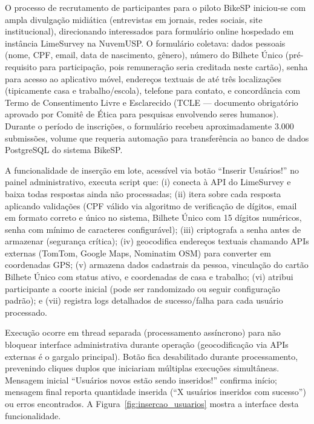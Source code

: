 

O processo de recrutamento de participantes para o piloto BikeSP iniciou-se com ampla divulgação midiática (entrevistas em jornais, redes sociais, site institucional), direcionando interessados para formulário online hospedado em instância LimeSurvey na NuvemUSP. O formulário coletava: dados pessoais (nome, CPF, email, data de nascimento, gênero), número do Bilhete Único (pré-requisito para participação, pois remuneração seria creditada neste cartão), senha para acesso ao aplicativo móvel, endereços textuais de até três localizações (tipicamente casa e trabalho/escola), telefone para contato, e concordância com Termo de Consentimento Livre e Esclarecido (TCLE --- documento obrigatório aprovado por Comitê de Ética para pesquisas envolvendo seres humanos). Durante o período de inscrições, o formulário recebeu aproximadamente 3.000 submissões, volume que requeria automação para transferência ao banco de dados PostgreSQL do sistema BikeSP.

A funcionalidade de inserção em lote, acessível via botão ``Inserir Usuários!'' no painel administrativo, executa script que: (i) conecta à API do LimeSurvey e baixa todas respostas ainda não processadas; (ii) itera sobre cada resposta aplicando validações (CPF válido via algoritmo de verificação de dígitos, email em formato correto e único no sistema, Bilhete Único com 15 dígitos numéricos, senha com mínimo de caracteres configurável); (iii) criptografa a senha antes de armazenar (segurança crítica); (iv) geocodifica endereços textuais chamando APIs externas (TomTom, Google Maps, Nominatim OSM) para converter em coordenadas GPS; (v) armazena dados cadastrais da pessoa, vinculação do cartão Bilhete Único com status ativo, e coordenadas de casa e trabalho; (vi) atribui participante a coorte inicial (pode ser randomizado ou seguir configuração padrão); e (vii) registra logs detalhados de sucesso/falha para cada usuário processado.

Execução ocorre em thread separada (processamento assíncrono) para não bloquear interface administrativa durante operação (geocodificação via APIs externas é o gargalo principal). Botão fica desabilitado durante processamento, prevenindo cliques duplos que iniciariam múltiplas execuções simultâneas. Mensagem inicial ``Usuários novos estão sendo inseridos!'' confirma início; mensagem final reporta quantidade inserida (``X usuários inseridos com sucesso'') ou erros encontrados. A Figura~\ref{fig:insercao_usuarios} mostra a interface desta funcionalidade.

